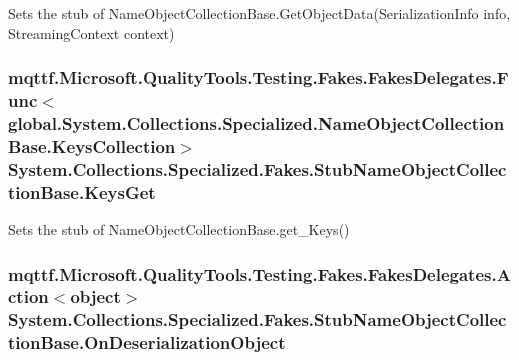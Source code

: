 Sets the stub of Name\-Object\-Collection\-Base.\-Get\-Object\-Data(\-Serialization\-Info info, Streaming\-Context context)

\hypertarget{class_system_1_1_collections_1_1_specialized_1_1_fakes_1_1_stub_name_object_collection_base_a7397eda0e20f6cadbbeba6cc82c5ef01}{
\subsubsection[{Keys\-Get}]{\setlength{\rightskip}{0pt plus 5cm}mqttf.\-Microsoft.\-Quality\-Tools.\-Testing.\-Fakes.\-Fakes\-Delegates.\-Func$<$global.\-System.\-Collections.\-Specialized.\-Name\-Object\-Collection\-Base.\-Keys\-Collection$>$ System.\-Collections.\-Specialized.\-Fakes.\-Stub\-Name\-Object\-Collection\-Base.\-Keys\-Get}}\label{class_system_1_1_collections_1_1_specialized_1_1_fakes_1_1_stub_name_object_collection_base_a7397eda0e20f6cadbbeba6cc82c5ef01}


Sets the stub of Name\-Object\-Collection\-Base.\-get\-\_\-\-Keys()

\hypertarget{class_system_1_1_collections_1_1_specialized_1_1_fakes_1_1_stub_name_object_collection_base_a0c22c926bee254a1e03c40de8ccce0de}{
\subsubsection[{On\-Deserialization\-Object}]{\setlength{\rightskip}{0pt plus 5cm}mqttf.\-Microsoft.\-Quality\-Tools.\-Testing.\-Fakes.\-Fakes\-Delegates.\-Action$<$object$>$ System.\-Collections.\-Specialized.\-Fakes.\-Stub\-Name\-Object\-Collection\-Base.\-On\-Deserialization\-Object}}\label{class_system_1_1_collections_1_1_specialized_1_1_fakes_1_1_stub_name_object_collection_base_a0c22c926bee254a1e03c40de8ccce0de}


